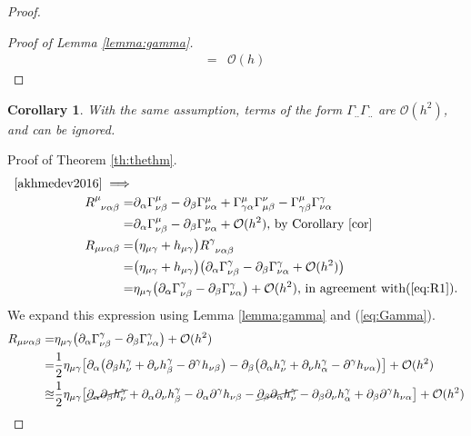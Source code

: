 \documentclass[]{article}
\newtheorem{corollary}[theorem]{Corollary}
\begin{document}
\begin{proof}
\begin{proof}[Proof of Lemma \ref{lemma:gamma}]
\begin{align*}
    	=& \mathcal{O}(h)
    	\end{align*}
    \end{proof}
	\begin{corollary}\label{cor}
		With the same assumption, terms of the form $\Gamma^{.}_{..}\Gamma^{.}_{..}$ are $\mathcal{O}(h^2)$, and can be ignored.
	\end{corollary}
	Proof of Theorem \ref{th:thethm}.
	\begin{align*}
	\text{\cite[(53)]{akhmedev2016}}\implies&\\
	R\indices{^{\mu}_{\nu\alpha\beta}}=&\partial_{\alpha}\Gamma^{\mu}_{\nu\beta} - \partial_{\beta}\Gamma^{\mu}_{\nu\alpha} + \Gamma^{\mu}_{\gamma\alpha}\Gamma^{\nu}_{\mu\beta} - \Gamma^{\mu}_{\gamma\beta} \Gamma^{\gamma}_{\nu\alpha}\\
	=& \partial_{\alpha}\Gamma^{\mu}_{\nu\beta} - \partial_{\beta}\Gamma^{\mu}_{\nu\alpha} + \mathcal{O}(h^2)\text{, by Corollary \ref{cor}}\\
	R_{\mu\nu\alpha\beta} =&\big(\eta_{\mu\gamma}+h_{\mu\gamma}\big)	R\indices{^{\gamma}_{\nu\alpha\beta}}\\
	=&\big(\eta_{\mu\gamma}+h_{\mu\gamma}\big) \big(\partial_{\alpha}\Gamma^{\gamma}_{\nu\beta} - \partial_{\beta}\Gamma^{\gamma}_{\nu\alpha} + \mathcal{O}(h^2)\big)\\
	=&\eta_{\mu\gamma}\big(\partial_{\alpha}\Gamma^{\gamma}_{\nu\beta} - \partial_{\beta}\Gamma^{\gamma}_{\nu\alpha} \big)+ \mathcal{O}(h^2)\text{, in agreement with(\ref{eq:R1}).}
	\end{align*}
	We expand this expression using Lemma \ref{lemma:gamma} and (\ref{eq:Gamma}).
	\begin{align*}
	R_{\mu\nu\alpha\beta} =&\eta_{\mu\gamma}\big(\partial_{\alpha}\Gamma^{\gamma}_{\nu\beta} - \partial_{\beta}\Gamma^{\gamma}_{\nu\alpha} \big)+ \mathcal{O}(h^2)\\
	=&\frac{1}{2}\eta_{\mu\gamma}\big[\partial_{\alpha}\big( \partial_{\beta}h^{\gamma}_{\nu} + \partial_{\nu}h^{\gamma}_{\beta}-\partial^{\gamma}h_{\nu\beta}  \big) - \partial_{\beta}\big( \partial_{\alpha}h^{\gamma}_{\nu}+\partial_{\nu}h^{\gamma}_{\alpha}-\partial^{\gamma}h_{\nu\alpha}  \big)\big]+ \mathcal{O}(h^2)\\
	\approxeq&\frac{1}{2}\eta_{\mu\gamma}\big[\cancel{\partial_{\alpha}\partial_{\beta}h^{\gamma}_{\nu}} + \partial_{\alpha}\partial_{\nu}h^{\gamma}_{\beta}-\partial_{\alpha}\partial^{\gamma}h_{\nu\beta}  -  \cancel{\partial_{\beta}\partial_{\alpha}h^{\gamma}_{\nu}}-\partial_{\beta}\partial_{\nu}h^{\gamma}_{\alpha}+\partial_{\beta}\partial^{\gamma}h_{\nu\alpha}  \big]+ \mathcal{O}(h^2)\\

\end{align*}
\end{proof}
\end{document}
